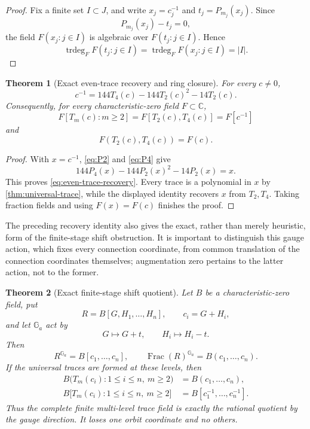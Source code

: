 \documentclass[11pt]{article}
\newtheorem{theorem}{Theorem}[section]
\theoremstyle{definition}
\theoremstyle{remark}
\newcommand{\C}{\mathbb C}
\newcommand{\trdeg}{\operatorname{trdeg}}
\begin{document}
\begin{proof}
Fix a finite set \(I\subset J\), and write
\(x_j=c_j^{-1}\) and \(t_j=P_{m_j}(x_j)\).  Since
\[
 P_{m_j}(x_j)-t_j=0,
\]
the field \(F(x_j:j\in I)\) is algebraic over \(F(t_j:j\in I)\).  Hence
\[
 \trdeg_FF(t_j:j\in I)
 =\trdeg_FF(x_j:j\in I)=|I|.
\]
\end{proof}

\begin{theorem}[Exact even-trace recovery and ring closure]
\label{cor:fixed-level-closure}
For every \(c\ne0\),
\begin{equation}\label{eq:even-trace-recovery}
 \boxed{\displaystyle
 c^{-1}=144T_4(c)-144T_2(c)^2-14T_2(c).}
\end{equation}
Consequently, for every characteristic-zero field \(F\subset\C\),
\[
 \boxed{\displaystyle
 F[T_m(c):m\ge2]
 =F[T_2(c),T_4(c)]
 =F[c^{-1}]}
\]
and
\[
 \boxed{F(T_2(c),T_4(c))=F(c).}
\]
\end{theorem}

\begin{proof}
With \(x=c^{-1}\), \eqref{eq:P2} and \eqref{eq:P4} give
\[
 144P_4(x)-144P_2(x)^2-14P_2(x)=x.
\]
This proves \eqref{eq:even-trace-recovery}.  Every trace is a polynomial in
\(x\) by \cref{thm:universal-trace}, while the displayed identity recovers
\(x\) from \(T_2,T_4\).  Taking fraction fields and using \(F(x)=F(c)\)
finishes the proof.
\end{proof}

The preceding recovery identity also gives the exact, rather than merely
heuristic, form of the finite-stage shift obstruction.  It is important to
distinguish this gauge action, which fixes every connection coordinate,
from common translation of the connection coordinates themselves;
augmentation zero pertains to the latter action, not to the former.

\begin{theorem}[Exact finite-stage shift quotient]
\label{thm:exact-shift-quotient}
Let \(B\) be a characteristic-zero field, put
\[
 R=B[G,H_1,\ldots,H_n],\qquad c_i=G+H_i,
\]
and let \(\mathbb G_a\) act by
\begin{equation}\label{eq:gauge-action}
 G\longmapsto G+t,\qquad H_i\longmapsto H_i-t.
\end{equation}
Then
\begin{equation}\label{eq:shift-invariant-ring}
 \boxed{R^{\mathbb G_a}=B[c_1,\ldots,c_n],\qquad
 \operatorname{Frac}(R)^{\mathbb G_a}=B(c_1,\ldots,c_n).}
\end{equation}
If the universal traces are formed at these levels, then
\begin{align}
 B\bigl(T_m(c_i):1\le i\le n,\ m\ge2\bigr)
 &=B(c_1,\ldots,c_n),\label{eq:trace-invariant-field}\\
 B\bigl[T_m(c_i):1\le i\le n,\ m\ge2\bigr]
 &=B[c_1^{-1},\ldots,c_n^{-1}].\label{eq:trace-invariant-ring}
\end{align}
Thus the complete finite multi-level trace field is exactly the rational
quotient by the gauge direction.  It loses one orbit coordinate and no
others.
\end{theorem}
\end{document}
